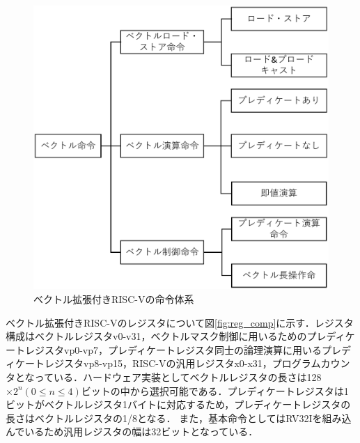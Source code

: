 \begin{figure}[tb]
    \centering
    \includegraphics[scale=0.5]{image/Inst_map.pdf}
    \caption{ベクトル拡張付きRISC-Vの命令体系}
    \label{fig:Inst_map}
\end{figure}

ベクトル拡張付きRISC-Vのレジスタについて図\ref{fig:reg_comp}に示す．レジスタ構成はベクトルレジスタv0-v31，ベクトルマスク制御に用いるためのプレディケートレジスタvp0-vp7，プレディケートレジスタ同士の論理演算に用いるプレディケートレジスタvp8-vp15，RISC-Vの汎用レジスタx0-x31，プログラムカウンタとなっている．ハードウェア実装としてベクトルレジスタの長さは128$\times 2^n(0\leq n\leq 4)$ビットの中から選択可能である．プレディケートレジスタは1ビットがベクトルレジスタ1バイトに対応するため，プレディケートレジスタの長さはベクトルレジスタの1/8となる．
また，基本命令としてはRV32Iを組み込んでいるため汎用レジスタの幅は32ビットとなっている．


